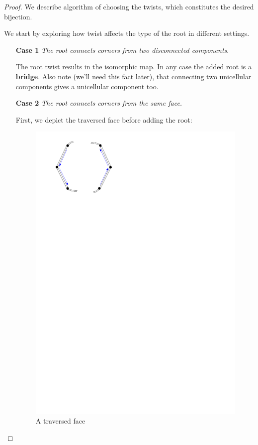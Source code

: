 \documentclass{article}
\begin{document}
\begin{proof}
	
	We describe algorithm of choosing the twists, which constitutes the desired bijection.
	
	We start by exploring how twist affects the type of the root in different settings.
	
	\begin{itemize}
		\item[\textbf{Case 1}] \emph{The root connects corners from two disconnected components}.
		
		The root twist results in the isomorphic map. In any case the added root is a \textbf{bridge}. Also note (we'll need this fact later), that connecting two unicellular components gives a unicellular component too.

		\item[\textbf{Case 2}] \emph{The root connects corners from the same face.}
		
		 First, we depict the traversed face before adding the root:
		
		\begin{figure}[H]
			\includegraphics[scale=0.4]{traversed_face}
			\centering
			\caption{A traversed face}
		\end{figure}
		

\end{itemize}
\end{proof}
\end{document}
